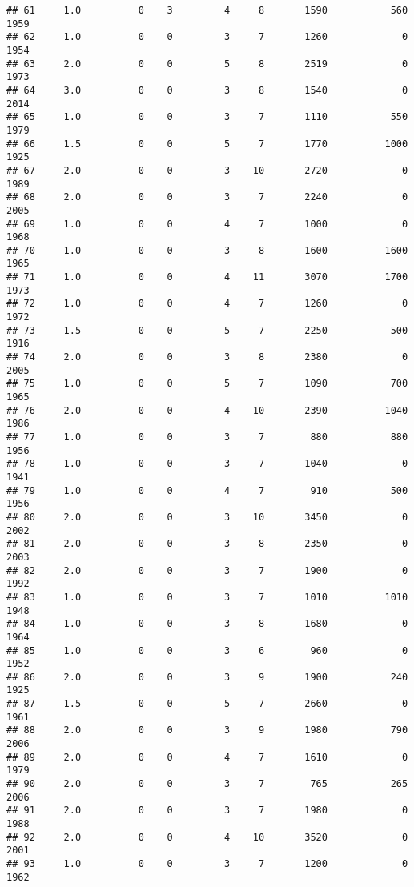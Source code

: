 \documentclass[
]{article}
\begin{document}
\begin{verbatim}
## 61     1.0          0    3         4     8       1590           560     1959
## 62     1.0          0    0         3     7       1260             0     1954
## 63     2.0          0    0         5     8       2519             0     1973
## 64     3.0          0    0         3     8       1540             0     2014
## 65     1.0          0    0         3     7       1110           550     1979
## 66     1.5          0    0         5     7       1770          1000     1925
## 67     2.0          0    0         3    10       2720             0     1989
## 68     2.0          0    0         3     7       2240             0     2005
## 69     1.0          0    0         4     7       1000             0     1968
## 70     1.0          0    0         3     8       1600          1600     1965
## 71     1.0          0    0         4    11       3070          1700     1973
## 72     1.0          0    0         4     7       1260             0     1972
## 73     1.5          0    0         5     7       2250           500     1916
## 74     2.0          0    0         3     8       2380             0     2005
## 75     1.0          0    0         5     7       1090           700     1965
## 76     2.0          0    0         4    10       2390          1040     1986
## 77     1.0          0    0         3     7        880           880     1956
## 78     1.0          0    0         3     7       1040             0     1941
## 79     1.0          0    0         4     7        910           500     1956
## 80     2.0          0    0         3    10       3450             0     2002
## 81     2.0          0    0         3     8       2350             0     2003
## 82     2.0          0    0         3     7       1900             0     1992
## 83     1.0          0    0         3     7       1010          1010     1948
## 84     1.0          0    0         3     8       1680             0     1964
## 85     1.0          0    0         3     6        960             0     1952
## 86     2.0          0    0         3     9       1900           240     1925
## 87     1.5          0    0         5     7       2660             0     1961
## 88     2.0          0    0         3     9       1980           790     2006
## 89     2.0          0    0         4     7       1610             0     1979
## 90     2.0          0    0         3     7        765           265     2006
## 91     2.0          0    0         3     7       1980             0     1988
## 92     2.0          0    0         4    10       3520             0     2001
## 93     1.0          0    0         3     7       1200             0     1962

\end{verbatim}
\end{document}
